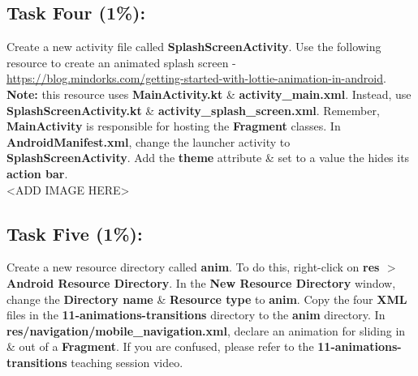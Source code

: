 \documentclass{article}
\begin{document}
\subsection*{Task Four (1\%):}
Create a new activity file called \textbf{SplashScreenActivity}. Use the following resource to create an animated splash screen - \href{https://blog.mindorks.com/getting-started-with-lottie-animation-in-android}{https://blog.mindorks.com/getting-started-with-lottie-animation-in-android}. \textbf{Note:} this resource uses \textbf{MainActivity.kt} \& \textbf{activity\_main.xml}. Instead, use \textbf{SplashScreenActivity.kt} \& \textbf{activity\_splash\_screen.xml}. Remember, \textbf{MainActivity} is responsible for hosting the \textbf{Fragment} classes. In \textbf{AndroidManifest.xml}, change the launcher activity to \textbf{SplashScreenActivity}. Add the \textbf{theme} attribute \& set to a value the hides its \textbf{action bar}. \\ 

<ADD IMAGE HERE>

\subsection*{Task Five (1\%):}
Create a new resource directory called \textbf{anim}. To do this, right-click on \textbf{res $>$ Android Resource Directory}. In the \textbf{New Resource Directory} window, change the \textbf{Directory name} \& \textbf{Resource type} to \textbf{anim}. Copy the four \textbf{XML} files in the \textbf{11-animations-transitions} directory to the \textbf{anim} directory. In \textbf{res/navigation/mobile\_navigation.xml}, declare an animation for sliding in \& out of a \textbf{Fragment}. If you are confused, please refer to the \textbf{11-animations-transitions} teaching session video.
\end{document}
